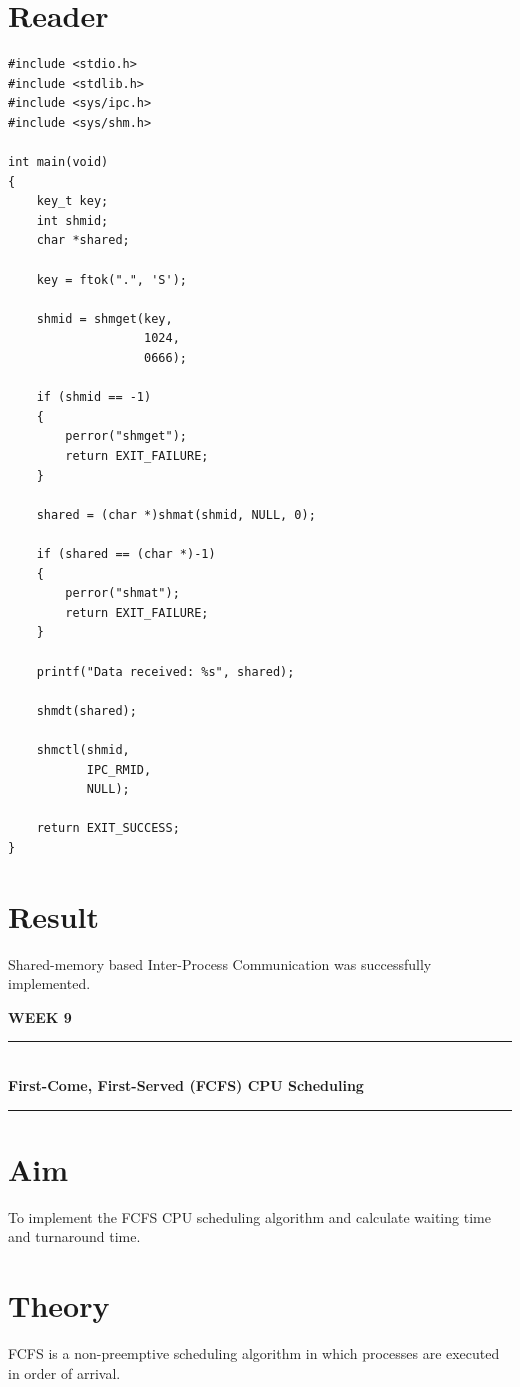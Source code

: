 \documentclass[12pt,a4paper]{report}
\newcommand{\experimenttitle}[2]{
\clearpage
\begin{center}
{\Large\bfseries\color{univblue} WEEK #1}\\[0.15cm]
\rule{\textwidth}{1pt}\\[0.2cm]
{\LARGE\bfseries #2}\\[0.2cm]
\rule{\textwidth}{1pt}
\end{center}
\vspace{0.4cm}
}
\begin{document}
\section*{Reader}

\begin{lstlisting}
#include <stdio.h>
#include <stdlib.h>
#include <sys/ipc.h>
#include <sys/shm.h>

int main(void)
{
    key_t key;
    int shmid;
    char *shared;

    key = ftok(".", 'S');

    shmid = shmget(key,
                   1024,
                   0666);

    if (shmid == -1)
    {
        perror("shmget");
        return EXIT_FAILURE;
    }

    shared = (char *)shmat(shmid, NULL, 0);

    if (shared == (char *)-1)
    {
        perror("shmat");
        return EXIT_FAILURE;
    }

    printf("Data received: %s", shared);

    shmdt(shared);

    shmctl(shmid,
           IPC_RMID,
           NULL);

    return EXIT_SUCCESS;
}
\end{lstlisting}

\section*{Result}

Shared-memory based Inter-Process Communication was successfully implemented.


\experimenttitle{9}{First-Come, First-Served (FCFS) CPU Scheduling}

\section*{Aim}

To implement the FCFS CPU scheduling algorithm and calculate waiting time and
turnaround time.

\section*{Theory}

FCFS is a non-preemptive scheduling algorithm in which processes are executed
in order of arrival.
\end{document}
